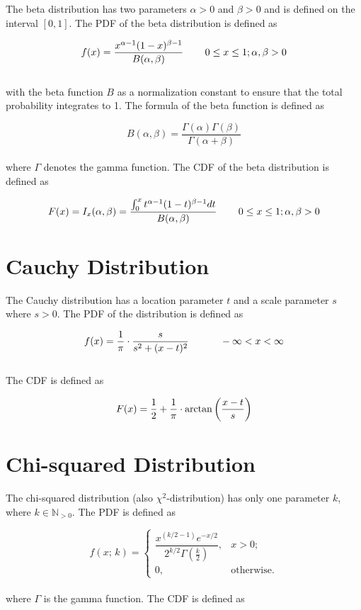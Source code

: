 		The beta distribution has two parameters $\alpha > 0$ and $\beta > 0$ and is defined on the interval $[0,1]$. The \ac{PDF} of the beta distribution is defined as

		$$f(x) = \frac{x^{\alpha-1}(1-x)^{\beta-1}}{B(\alpha,\beta)}  \hspace{.3in} 0 \le x \le 1; \alpha, \beta > 0$$
		\\[0.3cm]		
		with the beta function $B$ as a normalization constant to ensure that the total probability integrates to 1. The formula of the beta function is defined as

		$$B(\alpha,\beta) = \frac{\Gamma(\alpha)\Gamma(\beta)}{\Gamma(\alpha + \beta)}$$
		\\[0.3cm]
		where $\Gamma$ denotes the gamma function. The \ac{CDF} of the beta distribution is defined as

		$$F(x) = I_{x}(\alpha,\beta) = \frac{\int_{0}^{x}{t^{\alpha-1}(1-t)^{\beta-1}dt}}{B(\alpha,\beta)} \hspace{.3in} 0 \le x \le 1; \alpha, \beta > 0$$


	\section{Cauchy Distribution}

		The Cauchy distribution has a location parameter $t$ and a scale parameter $s$ where $s > 0$. The \ac{PDF} of the distribution is defined as

		$$\displaystyle f(x) = \frac{1}{\pi} \cdot \frac{s}{s^2 + (x-t)^2} \quad \hspace{.3in} -\infty<x<\infty$$
		\\[0.3cm]
		The \ac{CDF} is defined as 

		$$\displaystyle F(x) = \frac{1}{2} + \frac{1}{\pi} \cdot \arctan\left(\frac{x-t}{s}\right)$$		

	\section{Chi-squared Distribution}

		The chi-squared distribution (also $\chi^2$-distribution) has only one parameter $k$, where $k \in \mathbb{N}_{>0}$. The \ac{PDF} is defined as

		$$f(x;\,k) =
		\begin{cases}
			\dfrac{x^{(k/2-1)} e^{-x/2}}{2^{k/2} \Gamma\left(\frac k 2 \right)},  & x > 0; \\ 0, & \text{otherwise}.
		\end{cases}$$
		\\[0.3cm]
		where $\Gamma$ is the gamma function. The \ac{CDF} is defined as

